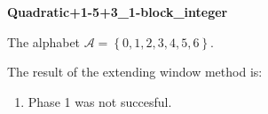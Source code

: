 \begin{exmp}
\textbf{ Quadratic+1-5+3\_1-block\_integer }

\label{ex:Quadratic+1-5+31-blockinteger}

The alphabet $\mathcal{A} =\left\{0, 1, 2, 3, 4, 5, 6\right\}$.

The result of the extending window method is:
\begin{enumerate}
    \item Phase 1 was not succesful. 

\end{enumerate}
\end{exmp}
